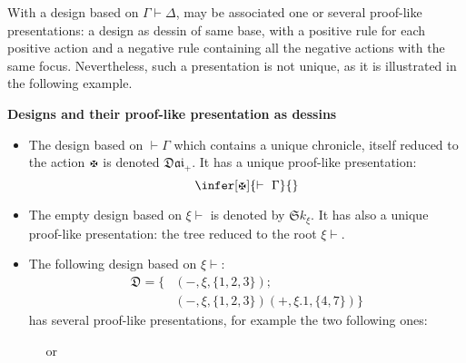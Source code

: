 \documentclass{LMCS}
\newcommand{\design}[1]{{\mathfrak{#1}}}
\newcommand{\dai}{\design{Dai}}
\begin{document}
\noindent With a design based on $\Gamma\vdash\Delta$, may be associated one or several proof-like presentations: a design as dessin of same base, with a positive rule for each positive action and a negative rule containing all the negative actions with the same focus. Nevertheless, such a presentation is not unique, as it is illustrated in the following example. 
\begin{exa} {\bf Designs and their proof-like presentation as dessins}\label{design-as-dessin}
\begin{itemize}
\item The design based on  $\vdash\Gamma$ which contains a unique chronicle, itself reduced to the action  $\daimon$ is denoted $\dai_+$. It has a unique proof-like presentation: 
$$
\infer[\daimon]{\vdash~ \Gamma}{}
$$
\item The empty design based on  $\xi\vdash$ is denoted by ${\design S}k_\xi$. It has also a unique proof-like presentation: the tree reduced to the root  $\xi\vdash$.
\item  The following design based on $\xi\vdash$:
 $$
 \begin{array}{cl}
 \design D=\{ &  (-,\xi,\{1,2,3\});\\
              & (-,\xi,\{1,2,3\})(+,\xi.1,\{4,7\})\}
                        \end{array}
                        $$
                        has several proof-like presentations, for example the two following ones:
\begin{center}
                     $\quad$ or $\quad$

\end{center}
\end{itemize}
\end{exa}
\end{document}
